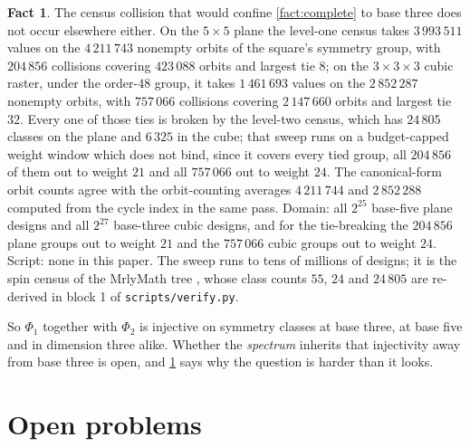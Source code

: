 \documentclass[11pt]{amsart}
\theoremstyle{definition}
\newtheorem{fact}[theorem]{Fact}
\theoremstyle{remark}
\begin{document}
\begin{fact}
\label{fact:wider}
The census collision that would confine \cref{fact:complete} to base three does not occur elsewhere either. On the $5 \times 5$ plane the level-one census takes $3\,993\,511$ values on the $4\,211\,743$ nonempty orbits of the square's symmetry group, with $204\,856$ collisions covering $423\,088$ orbits and largest tie $8$; on the $3 \times 3 \times 3$ cubic raster, under the order-$48$ group, it takes $1\,461\,693$ values on the $2\,852\,287$ nonempty orbits, with $757\,066$ collisions covering $2\,147\,660$ orbits and largest tie $32$. Every one of those ties is broken by the level-two census, which has $24\,805$ classes on the plane and $6\,325$ in the cube; that sweep runs on a budget-capped weight window which does not bind, since it covers every tied group, all $204\,856$ of them out to weight $21$ and all $757\,066$ out to weight $24$. The canonical-form orbit counts agree with the orbit-counting averages $4\,211\,744$ and $2\,852\,288$ computed from the cycle index in the same pass. Domain: all $2^{25}$ base-five plane designs and all $2^{27}$ base-three cubic designs, and for the tie-breaking the $204\,856$ plane groups out to weight $21$ and the $757\,066$ cubic groups out to weight $24$. Script: none in this paper. The sweep runs to tens of millions of designs; it is the spin census of the MrlyMath tree \cite{tree}, whose class counts $55$, $24$ and $24\,805$ are re-derived in block 1 of \texttt{scripts/verify.py}.
\end{fact}

So $\Phi_1$ together with $\Phi_2$ is injective on symmetry classes at base three, at base five and in dimension three alike. Whether the \emph{spectrum} inherits that injectivity away from base three is open, and \cref{sec:open} says why the question is harder than it looks.

\section{Open problems}
\label{sec:open}
\end{document}
